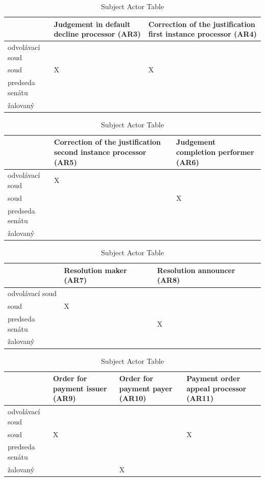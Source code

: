 \begin{landscape}
\begin{table}[h]
\caption{Subject Actor Table}
\label{tab:subjectactortable}
\begin{tabular}{|l|l|l|}
\hline
  & Judgement in default decline processor (AR3)  &  Correction of the justification first instance processor (AR4)   \\ \hline
odvolávací soud &  &   \\ \hline
soud & X & X  \\ \hline
predseda senátu &  &   \\ \hline
žalovaný & &  \\ \hline
\end{tabular}
\end{table}

\begin{table}[h]
\caption{Subject Actor Table}
\label{tab:subjectactortable}
\begin{tabular}{|l|l|l|}
\hline
  &  Correction of the justification second instance processor (AR5)  &  Judgement completion performer (AR6)   \\ \hline
odvolávací soud & X &   \\ \hline
soud &  & X  \\ \hline
predseda senátu &  &  \\ \hline
žalovaný & &  \\ \hline
\end{tabular}
\end{table}

\begin{table}[h]
\caption{Subject Actor Table}
\label{tab:subjectactortable}
\begin{tabular}{|l|l|l|}
\hline
  &  Resolution maker (AR7)  &  Resolution announcer (AR8)    \\ \hline
odvolávací soud &   &  \\ \hline
soud &  X &   \\ \hline
predseda senátu &  & X  \\ \hline
žalovaný & &  \\ \hline
\end{tabular}
\end{table}

\begin{table}[h]
\caption{Subject Actor Table}
\label{tab:subjectactortable}
\begin{tabular}{|l|l|l|l|}
\hline
  &  Order for payment issuer (AR9)  &  Order for payment payer (AR10) &  Payment order appeal processor (AR11)   \\ \hline
odvolávací soud &  &  &  \\ \hline
soud &  X &  & X   \\ \hline
predseda senátu &  &  &   \\ \hline
žalovaný & & X &  \\ \hline
\end{tabular}
\end{table}


\end{landscape}
